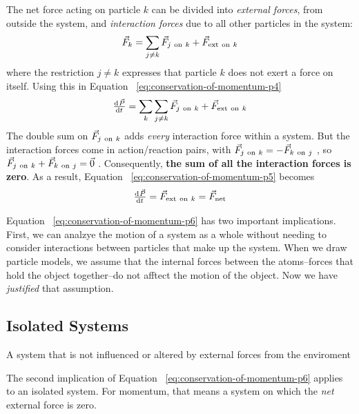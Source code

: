 The net force acting on particle
$
    k
$ can be divided into \emph{external forces}, from outside the system,
and \emph{interaction forces} due to all other particles in the system:
\begin{equation}
    \vec{F}_k = \sum_{j\neq k} \vec{F}_{j \mathrm{~on~} k} + \vec{F}_{\mathrm{ext}
    \mathrm{~on~} k}
\end{equation}
where the restriction
$
    j \neq k
$ expresses that particle
$
    k
$ does not exert a force on itself.  Using this in Equation~%
\ref{eq:conservation-of-momentum-p4}
\begin{equation}
    \label{eq:conservation-of-momentum-p5} \od{\vec{P}}{t} = \sum_k \sum_
    {j \neq k} \vec{F}_{j \on k} + \vec{F}_{\mathrm{ext} \on k}
\end{equation}
The double sum on
$
    \vec{F}_{j \mathrm{~on~} k}
$ adds \emph{every} interaction force within a system.  But the
interaction forces come in action/reaction pairs, with
$
    \vec{F}_{j \mathrm{~on~} k} = -\vec{F}_{k \mathrm{~on~} j}
$ %
, so
$
    \vec{F}_{j \mathrm{~on~} k} + \vec{F}_{k \mathrm{~on~} j} = \vec{0}
$ %
.  Consequently, \textbf{the sum of all the interaction forces is zero}.
As a result, Equation~%
\ref{eq:conservation-of-momentum-p5} becomes
\begin{equation}
    \label{eq:conservation-of-momentum-p6} \od{\vec{P}}{t} = \vec{F}_ {\mathrm
    {ext} \on k} = \fnet
\end{equation}

Equation~%
\ref{eq:conservation-of-momentum-p6} has two important implications.
First, we can analzye the motion of a system as a whole without needing
to consider interactions between particles that make up the system.
When we draw particle models, we assume that the internal forces between
the atoms--forces that hold the object together--do not afftect the
motion of the object.  Now we have \emph{justified} that assumption.

\subsection{Isolated Systems}

\begin{definition}
    A system that is not influenced or altered by external forces from
    the enviroment
\end{definition}

The second implication of Equation~%
\ref{eq:conservation-of-momentum-p6} applies to an isolated system.  For
momentum, that means a system on which the \emph{net} external force is
zero.

